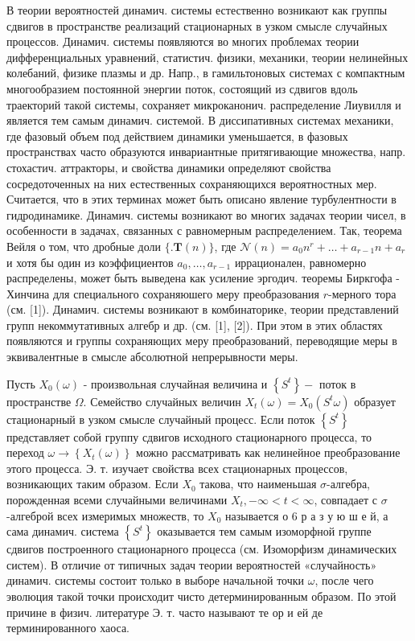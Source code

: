 \documentclass[10pt]{article}
\begin{document}
В теории вероятностей динамич. системы естественно возникают как группы сдвигов в пространстве реализаций стационарных в узком смысле случайных процессов. Динамич. системы появляются во многих проблемах теории дифференциальных уравнений, статистич. физики, механики, теории нелинейных колебаний, физике плазмы и др. Напр., в гамильтоновых системах с компактным многообразием постоянной энергии поток, состоящий из сдвигов вдоль траекторий такой системы, сохраняет микроканонич. распределение Лиувилля и является тем самым динамич. системой. В диссипативных системах механики, где фазовый объем под действием динамики уменьшается, в фазовых пространствах часто образуются инвариантные притягивающие множества, напр. стохастич. аттракторы, и свойства динамики определяют свойства сосредоточенных на них естественных сохраняющихся вероятностных мер. Считается, что в этих терминах может быть описано явление турбулентности в гидродинамике. Динамич. системы возникают во многих задачах теории чисел, в особенности в задачах, связанных с равномерным распределением. Так, теорема Вейля о том, что дробные доли $\{. \boldsymbol{T}(n)\}$, где $\mathscr{N}(n)=a_{0} n^{r}+\ldots+a_{r-1} n+a_{r}$ и хотя бы один из коэффициентов $a_{0}, \ldots, a_{r-1}$ иррационален, равномерно распределены, может быть выведена как усиление эргодич. теоремы Биркгофа - Хинчина для специального сохраняюшего меру преобразования $r$-мерного тора (см. [1]). Динамич. системы возникают в комбинаторике, теории представлений групп некоммутативных алгебр и др. (см. [1], [2]). При этом в этих областях появляются и группы сохраняющих меру преобразований, переводящие меры в эквивалентные в смысле абсолютной непрерывности меры.



Пусть $X_{0}(\omega)$ - произвольная случайная величина и $\left\{S^{t}\right\}-$ поток в пространстве $\Omega$. Семейство случайных величин $X_{t}(\omega)=X_{0}\left(S^{t} \omega\right)$ образует стационарный в узком смысле случайный процесс. Если поток $\left\{S^{t}\right\}$ представляет собой группу сдвигов исходного стационарного процесса, то переход $\omega \rightarrow\left\{X_{t}(\omega)\right\}$ можно рассматривать как нелинейное преобразование этого процесса. Э. т. изучает свойства всех стационарных процессов, возникающих таким образом. Если $X_{0}$ такова, что наименьшая $\sigma$-алгебра, порожденная всеми случайными величинами $X_{t},-\infty<t<\infty$, совпадает с $\sigma$-алгеброй всех измеримых множеств, то $X_{0}$ называется о 6 р а з у ю ш е й, а сама динамич. система $\left\{S^{t}\right\}$ оказывается тем самым изоморфной группе сдвигов построенного стационарного процесса (см. Изоморфизм динамических систем). В отличие от типичных задач теории вероятностей «случайность» динамич. системы состоит только в выборе начальной точки $\omega$, после чего эволюция такой точки происходит чисто детерминированным образом. По этой причине в физич. литературе Э. т. часто называют те ор и ей де терминированного хаоса.
\end{document}
